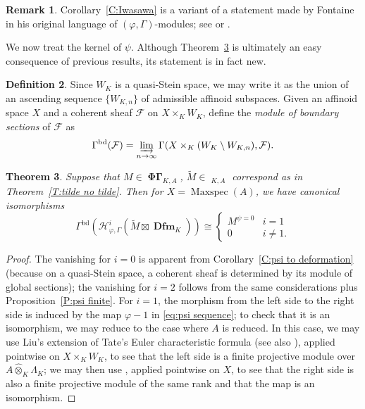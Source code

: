 \documentclass[12pt]{amsart}
\newtheorem{theorem}{Theorem}[section]
\theoremstyle{definition}
\newtheorem{defn}[theorem]{Definition}
\newtheorem{remark}[theorem]{Remark}
\numberwithin{equation}{theorem}
\newcommand{\calF}{\mathcal{F}}
\newcommand{\calH}{\mathcal{H}}
\DeclareMathOperator{\bd}{bd}
\DeclareMathOperator{\Dfm}{\mathbf{Dfm}}
\DeclareMathOperator{\Maxspec}{Maxspec}
\DeclareMathOperator{\PhiGamma}{\mathbf{\Phi \Gamma}}
\DeclareMathOperator{\PhiGammatilde}{\widetilde{\mathbf{\Phi \Gamma}}}
\begin{document}
\begin{remark}
Corollary~\ref{C:Iwasawa} is a variant of a statement made by Fontaine in his original language of $(\varphi, \Gamma)$-modules; see \cite[\S II.1]{cherbonnier-colmez}
or \cite[Theorem~II.8]{berger-explicit}.
\end{remark}

We now treat the kernel of $\psi$. Although Theorem~\ref{T:psi kernel} is ultimately an easy consequence of previous results, its statement is in fact new.
\begin{defn}
Since $W_K$ is a quasi-Stein space, we may write it as the union of an ascending sequence $\{W_{K,n}\}$ of admissible affinoid subspaces. Given an affinoid space $X$ and a coherent sheaf $\calF$ on $X \times_K W_K$, define the \emph{module of boundary sections} of $\calF$ 
as 
\[
\Gamma^{\bd}(\calF) = 
\varinjlim_{n \to \infty} \Gamma(X \times_K (W_K \setminus W_{K,n}), \calF).
\]
\end{defn}

\begin{theorem} \label{T:psi kernel}
Suppose that $M \in \PhiGamma_{K,A}$,
$\tilde{M} \in \PhiGammatilde_{K,A}$ correspond as in
Theorem~\ref{T:tilde no tilde}.
Then for $X = \Maxspec(A)$,
we have canonical isomorphisms
\[
\Gamma^{\bd}(\calH^i_{\varphi,\Gamma}(\tilde{M} \boxtimes \Dfm_K)) \cong \begin{cases} M^{\psi=0} & i=1 \\ 0 & i \neq 1.
\end{cases}
\]
\end{theorem}
\begin{proof}
The vanishing for $i=0$ is apparent from Corollary~\ref{C:psi to deformation}
(because on a quasi-Stein space, a coherent sheaf is determined by its module of global sections); the vanishing for $i=2$ follows from the same considerations plus 
Proposition~\ref{P:psi finite}. For $i=1$, the morphism from the left side to the right side is induced by the map $\varphi-1$ in \eqref{eq:psi sequence}; to check that it is an isomorphism, we may reduce to the case where $A$ is reduced. In this case, we may
use Liu's extension of Tate's Euler characteristic formula \cite{liu-herr} (see also \cite[Theorem~2.3.11]{kpx}), applied pointwise on $X \times_K W_K$,
to see that the left side is a finite projective module over $A \widehat{\otimes}_K \Lambda_K$; we may then use \cite[Proposition~4.3.8]{kpx}, applied pointwise on $X$, to see that the right side is also a finite projective module of the same rank and that the map is an isomorphism.
\end{proof}
\end{document}
